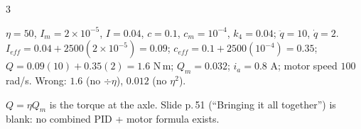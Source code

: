 \begin{multicols}{3}
{}
\begin{worked}
$\eta{=}50$, $I_m{=}2{\times}10^{-5}$, $I{=}0.04$, $c{=}0.1$, $c_m{=}10^{-4}$, $k_4{=}0.04$; $\ddot q{=}10$, $\dot q{=}2$. $I_{eff}=0.04+2500(2{\times}10^{-5})=0.09$; $c_{eff}=0.1+2500(10^{-4})=0.35$; $Q=0.09(10)+0.35(2)=1.6$ N\,m; $Q_m=0.032$; $i_a=0.8$ A; motor speed $100$ rad/s. Wrong: $1.6$ (no $\div\eta$), $0.012$ (no $\eta^2$).
\end{worked}
\begin{slideerr}[p.50, 51]
$Q=\eta Q_m$ is the torque at the axle. Slide p.\,51 (``Bringing it all together'') is blank: no combined PID + motor formula exists.
\end{slideerr}


\end{multicols}
